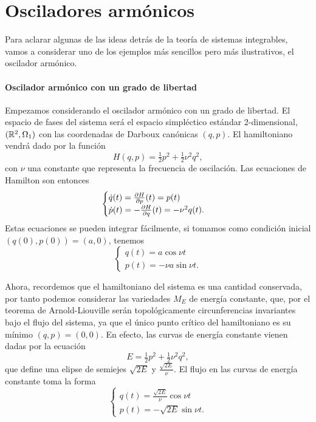 \section{Osciladores armónicos}
Para aclarar algunas de las ideas detrás de la teoría de sistemas integrables, vamos a considerar uno de los ejemplos más sencillos pero más ilustrativos, el oscilador armónico.

\paragraph{\bf Oscilador armónico con un grado de libertad}\mbox{}

  Empezamos considerando el oscilador armónico con un grado de libertad. El espacio de fases del sistema será el espacio simpléctico estándar $2$-dimensional, $(\mathbb{R}^2,\Omega_1)$ con las coordenadas de Darboux canónicas $(q,p)$. El hamiltoniano vendrá dado por la función
  \begin{equation*}
    H(q,p)=\tfrac{1}{2}p^2+\tfrac{1}{2}\nu^2 q^2,
  \end{equation*}
  con $\nu$ una constante que representa la frecuencia de oscilación.
  Las ecuaciones de Hamilton son entonces
  \begin{equation*}
    \begin{cases}
      \dot q(t) = \frac{\partial H}{\partial p}(t)=p(t)\\
    \dot p(t) = -\frac{\partial H}{\partial q}(t)=-\nu^2q(t).
  \end{cases}
  \end{equation*}
  Estas ecuaciones se pueden integrar fácilmente, si tomamos como condición inicial $(q(0),p(0))=(a,0)$, tenemos
  \begin{equation*}
    \begin{cases}
   q(t)=a\cos\nu t \\ 
   p(t)=-\nu a\sin\nu t.
 \end{cases}
  \end{equation*}
  
  Ahora, recordemos que el hamiltoniano del sistema es una cantidad conservada, por tanto podemos considerar las variedades $M_E$ de energía constante, que, por el teorema de Arnold-Liouville serán topológicamente circunferencias invariantes bajo el flujo del sistema, ya que el único punto crítico del hamiltoniano es su mínimo $(q,p)=(0,0)$. En efecto, las curvas de energía constante vienen dadas por la ecuación
  \begin{equation*}
    E=\tfrac{1}{2}p^2+\tfrac{1}{2}\nu^2q^2,
  \end{equation*}
  que define una elipse de semiejes $\sqrt{2E}$ y $\frac{\sqrt{2E}}{\nu}$. El flujo en las curvas de energía constante toma la forma
  \begin{equation*}
    \begin{cases}
      q(t)=\frac{\sqrt{2E}}{\nu}\cos\nu t \\ 
      p(t)=-\sqrt{2E}\sin\nu t.
 \end{cases}
  \end{equation*}
  
